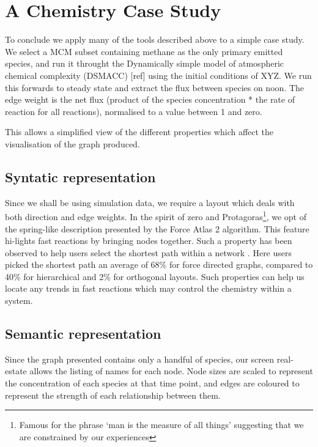 \section{A Chemistry Case Study}\label{sec:chemcase}
To conclude we apply many of the tools described above to a simple case study. We select a MCM subset containing methane as the only primary emitted species, and run it throught the Dynamically simple model of atmospheric chemical complexity (DSMACC) [ref] using the initial conditions of XYZ. We run this forwards to steady state and extract the flux between species on noon. The edge weight is the net flux (product of the species concentration * the rate of reaction for all reactions), normalised to a value between 1 and zero. 

This allows a simplified view of the different properties which affect the visualisation of the graph produced. 

\subsection{Syntatic representation} 
Since we shall be using simulation data, we require a layout which deals with both direction and edge weights. In the spirit of zero and Protagoras\footnote{Famous for the phrase `man is the measure of all things' suggesting that we are constrained by our experiences}, we opt of the spring-like description presented by the Force Atlas 2 algorithm. This feature hi-lights fast reactions by bringing nodes together. Such a property has been observed to help users select the shortest path within a network \citep{eyetrack}. Here users picked the shortest path an average of 68\% for force directed graphs, compared to 40\% for hierarchical and 2\% for orthogonal layouts. Such properties can help us locate any trends in fast reactions which may control the chemistry within a system. 


\subsection{Semantic representation}
Since the graph presented contains only a handful of species, our screen real-estate allows the listing of names for each node. Node sizes are scaled to represent the concentration of each species at that time point, and edges are coloured to represent the strength of each relationship between them. 


